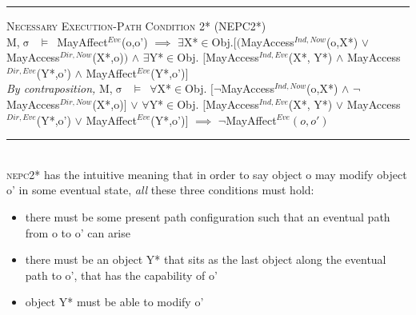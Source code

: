 \documentclass[a4paper,11pt, twoside,twocolumn]{article}
\newenvironment{logic}[1][]
{\begin{flushleft} \small }
{\end{flushleft}}
\newcommand{\loin}{$\in$}
\newcommand{\loforall}{$\forall$}
\newcommand{\loexists}{$\exists$}
\newcommand{\loand}{$\land$}
\newcommand{\loor} {$\lor$}
\newcommand{\loimplies}{$\implies$}
\newcommand{\losigma}{$\upsigma$}
\newcommand{\loturns} {$\vDash$}
\newcommand{\loneg}{$\boldsymbol \neg$}
\newcommand{\ablock} {\null\qquad}
\begin{document}
\begin{minipage}{\linewidth}
\begin{logic}
\hrule\null
\textsc{\normalsize *Necessary Execution-Path Condition 2* (NEPC2*)}\\
M,\losigma\ \loturns\ MayAffect$^{Eve}$(o,o')\linebreak
\ablock \loimplies\linebreak
\ablock \loexists X*\loin Obj.$[($MayAccess$^{Ind,Now}$(o,X*) \loor \linebreak
\ablock \ablock \ablock \quad MayAccess$^{Dir,Now}$(X*,o)$)$\linebreak
\ablock \ablock \ablock \ablock \loand \linebreak
\ablock \loexists Y*\loin{Obj}. $[$MayAccess$^{Ind,Eve}$(X*, Y*) \loand\linebreak
\ablock \ablock \ablock \quad MayAccess$^{Dir,Eve}$(Y*,o') \loand\linebreak
\ablock \ablock \ablock \quad MayAffect$^{Eve}$(Y*,o')$]$
\linebreak \\
\textit{By contraposition,}\linebreak
M,\losigma\ \loturns\ 
\loforall X*\loin Obj. $[$\loneg MayAccess$^{Ind,Now}$(o,X*) \loand \linebreak
\ablock \ablock \ablock \ablock \loneg MayAccess$^{Dir,Now}$(X*,o)$]$\linebreak
\ablock \ablock \ablock \ablock \loor \linebreak
\ablock \quad\loforall Y*\loin{Obj}. $[$MayAccess$^{Ind,Eve}$(X*, Y*) \loor\linebreak
\ablock \ablock \ablock \ablock MayAccess$^{Dir,Eve}$(Y*,o') \loor\linebreak
\ablock \ablock \ablock \ablock MayAffect$^{Eve}$(Y*,o')$]$
\ablock \loimplies \linebreak
	\ablock\loneg MayAffect$^{Eve}(o,o')$\linebreak
\hrule\null
\end{logic}
\end{minipage}
\linebreak\\

\textsc{nepc2*} has the intuitive meaning that in order to say object o may modify object o' in some eventual state, \textit{all} these three conditions must hold:
\begin{itemize}
\item there must be some present path configuration such that an eventual path from o to o' can arise
\item there must be an object Y* that sits as the last object along the eventual path to o', that has the capability of o'
\item object Y* must be able to modify o'
\end{itemize} 
\end{document}
